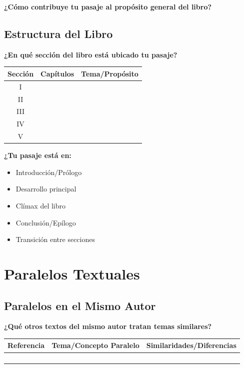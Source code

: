 \documentclass[11pt,a4paper]{article}
\begin{document}
\textbf{¿Cómo contribuye tu pasaje al propósito general del libro?}
\vspace{3cm}

\subsection{Estructura del Libro}

\textbf{¿En qué sección del libro está ubicado tu pasaje?}

\begin{tabularx}{\textwidth}{|c|X|X|}
\hline
\textbf{Sección} & \textbf{Capítulos} & \textbf{Tema/Propósito} \\
\hline
I & & \\[1cm]
\hline
II & & \\[1cm]
\hline
III & & \\[1cm]
\hline
IV & & \\[1cm]
\hline
V & & \\[1cm]
\hline
\end{tabularx}

\textbf{¿Tu pasaje está en:}
\begin{itemize}[leftmargin=1cm]
    \item[$\square$] Introducción/Prólogo
    \item[$\square$] Desarrollo principal
    \item[$\square$] Clímax del libro
    \item[$\square$] Conclusión/Epílogo
    \item[$\square$] Transición entre secciones
\end{itemize}

\newpage

\section{Paralelos Textuales}

\subsection{Paralelos en el Mismo Autor}

\textbf{¿Qué otros textos del mismo autor tratan temas similares?}

\begin{tabularx}{\textwidth}{|X|X|X|}
\hline
\textbf{Referencia} & \textbf{Tema/Concepto Paralelo} & \textbf{Similaridades/Diferencias} \\
\hline
& & \\[1.5cm]
\hline
& & \\[1.5cm]
\hline
& & \\[1.5cm]
\hline
& & \\[1.5cm]
\hline
\end{tabularx}
\end{document}
